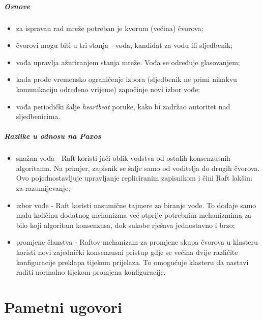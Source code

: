 \documentclass[times, utf8, diplomski]{fer}
\begin{document}
\subparagraph{Osnove}

\begin{itemize}

\item za ispravan rad mreže potreban je kvorum (većina) čvorova;

\item čvorovi mogu biti u tri stanja - vođa, kandidat za vođu ili sljedbenik;

\item vođa upravlja ažuriranjem stanja mreže. Vođa se određuje glasovanjem;

\item kada prođe vremensko ograničenje izbora (sljedbenik ne primi nikakvu komunikaciju određeno vrijeme) započinje novi izbor vođe;

\item vođa periodički šalje \textit{heartbeat} poruke, kako bi zadržao autoritet nad sljedbenicima.

\end{itemize}

\subparagraph{Razlike u odnosu na Paxos}

\begin{itemize}

\item snažan vođa - Raft koristi jači oblik vodstva od ostalih konsenzusnih algoritama. Na primjer, zapisnik se šalje samo od voditelja do drugih čvorova. Ovo pojednostavljuje upravljanje repliciranim zapisnikom i čini Raft lakšim za razumijevanje;

\item izbor vođe - Raft koristi nasumične tajmere za biranje vođe. To dodaje samo malu količinu dodatnog mehanizma već otprije potrebnim mehanizmima za bilo koji algoritam konsenzusa, dok sukobe rješava jednostavno i brzo;

\item promjene članstva - Raftov mehanizam za promjene skupa čvorova u klasteru koristi novi zajednički konsenzusni pristup gdje se većina dvije različite konfiguracije preklapa tijekom prijelaza. To omogućuje klasteru da nastavi raditi normalno tijekom promjena konfiguracije.

\end{itemize}

\section{Pametni ugovori}
\end{document}
